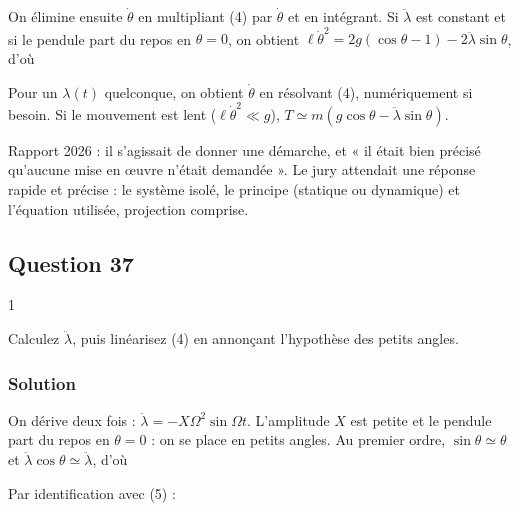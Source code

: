 \documentclass[11pt,a4paper]{article}
\newcommand{\equationajustee}[1]{%
  \sbox{\boiteequation}{$\displaystyle #1$}%
  \ifdim\wd\boiteequation>\linewidth
    \[\resizebox{\linewidth}{!}{\usebox{\boiteequation}}\]%
  \else
    \[#1\]%
  \fi}
\begin{document}
On élimine ensuite \(\dot\theta\) en multipliant (4) par \(\dot\theta\) et en intégrant. Si \(\ddot\lambda\) est constant et si le pendule part du repos en \(\theta=0\), on obtient \(\ell\dot\theta^2=2g(\cos\theta-1)-2\ddot\lambda\sin\theta\), d'où

\equationajustee{\boxed{T=m\big[g(3\cos\theta-2)-3\ddot\lambda\sin\theta\big]}}

Pour un \(\lambda(t)\) quelconque, on obtient \(\dot\theta\) en résolvant (4), numériquement si besoin. Si le mouvement est lent (\(\ell\dot\theta^2\ll g\)), \(T\simeq m(g\cos\theta-\ddot\lambda\sin\theta)\).

\begin{jury}

Rapport 2026 : il s'agissait de donner une démarche, et « il était bien précisé qu'aucune mise en œuvre n'était demandée ». Le jury attendait une réponse rapide et précise : le système isolé, le principe (statique ou dynamique) et l'équation utilisée, projection comprise.

\end{jury}

\hypertarget{question-37}{%
\subsection{Question 37}\label{question-37}}

\begin{indication}{1}

Calculez \(\ddot\lambda\), puis linéarisez (4) en annonçant l'hypothèse des petits angles.

\end{indication}

\hypertarget{solution-36}{%
\subsubsection{Solution}\label{solution-36}}

On dérive deux fois : \(\ddot\lambda=-X\Omega^2\sin\Omega t\). L'amplitude \(X\) est petite et le pendule part du repos en \(\theta=0\) : on se place en petits angles. Au premier ordre, \(\sin\theta\simeq\theta\) et \(\ddot\lambda\cos\theta\simeq\ddot\lambda\), d'où

\equationajustee{\ddot\theta-\frac{X\Omega^2}{\ell}\sin(\Omega t)+\frac g\ell\,\theta=0 .}

Par identification avec (5) :

\equationajustee{\boxed{\begin{aligned}{}&\ddot\theta+\omega^2\theta=\Gamma\sin(\Omega t)\\
&\omega=\sqrt{g/\ell}\\
&\Gamma=\frac{X\Omega^2}{\ell}
\end{aligned}}}
\end{document}

